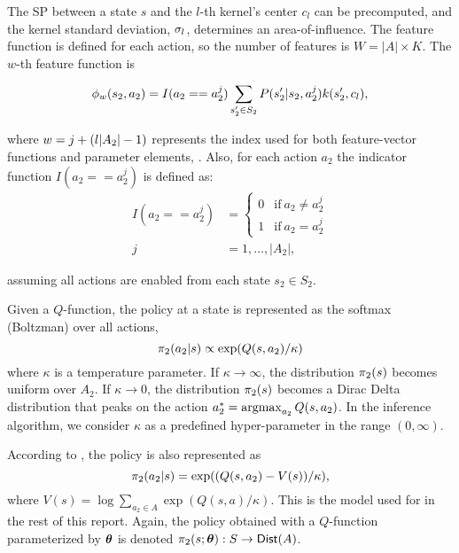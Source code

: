     \noindent
    The \ac{SP} between a state $s$ and the $l$-th kernel's center $c_l$ can be precomputed, and the kernel standard
    deviation, $\sigma_{l}$, determines an area-of-influence.  The feature function is defined for each
    action, so the number of features is $W = |A| \times K$. The $w$-th feature function is

    \begin{equation}\label{eq:kernel_func}
        \phi_{w}(s_2,a_2) =I(a_2==a_2^{j})\sum_{s_2'\in S_2}P(s_2'|s_2,a_2^{j}) k(s_2',c_{l}),
    \end{equation}

    \noindent
    where $w=j+(l|A_2|-1)$ represents the index used for both feature-vector functions and parameter elements,
    \paramElem.  Also, for each action $a_2$ the indicator function ${I(a_2==a_2^j)}$ is defined as:
    \begin{equation*}
        \begin{aligned}
            I(a_2==a_2^j) & = \begin{cases}
                                  0 & \text{if}\ a_2 \neq a_2^j \\
                                  1 & \text{if}\ a_2 = a_2^j
                              \end{cases} \\
            j & = 1, \ldots, |A_2|,
        \end{aligned}
    \end{equation*}

    \noindent
    assuming all actions are enabled from each state $s_2 \in S_2$.


    Given a $Q$-function, the policy at a state is represented as the softmax (Boltzman) over all actions,
    \[
    \pi_{2}(a_2|s) \propto \exp(Q(s,a_2)/\kappa)
    \]
    where $\kappa$ is a temperature parameter. If $\kappa \rightarrow \infty$, the distribution $ \pi_{2}(s) $
    becomes uniform over $A_2$. If $\kappa \rightarrow 0$, the distribution $ \pi_{2}(s) $   becomes a Dirac Delta
    distribution that peaks on the action $a_2^\ast = \mathop{\mathrm{argmax}}_{a_2} Q(s,a_2)$. In the inference algorithm, we consider
    $\kappa$ as a predefined hyper-parameter in the range $(0,\infty)$.


    According to \cite{nachum2017bridging}, the policy is also represented as
    \[
    \pi_{2}(a_2|s) = \exp((Q(s,a_2)- V(s))/\kappa),
    \]
    where $V(s) = \log \sum_{a_2\in A}\exp (Q(s,a)/\kappa)$. This is the model used for  in the rest of this
    report.  Again, the policy obtained with a $Q$-function parameterized by $\boldsymbol{\mathbb{\theta}}$ is denoted
    $\pi_{2}(s;\boldsymbol{\mathbb{\theta}}) : S\rightarrow \mathsf{Dist}(A)$.

